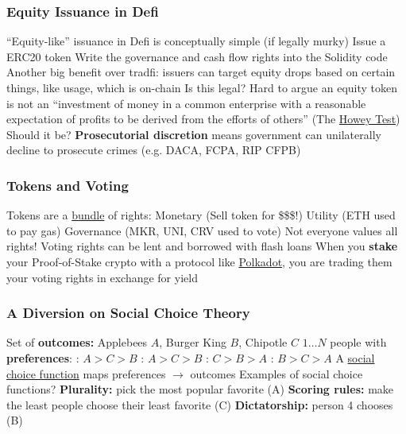 \documentclass[]{beamer}
\begin{document}
\begin{frame}
\frametitle{Equity Issuance in Defi}

\bi
\m ``Equity-like'' issuance in Defi is conceptually simple (if legally murky) 
\bi
\m Issue a ERC20 token
\m Write the governance and cash flow rights into the Solidity code 
\ei
\m Another big benefit over tradfi: issuers can target equity drops based on certain things, like usage, which is on-chain \pause 
\m Is this legal? \pause 
\bi 
\m Hard to argue an equity token is not an ``investment of money in a common enterprise with a reasonable expectation of profits to be derived from the efforts of others'' (The \href{https://www.sec.gov/about/divisions-offices/division-corporation-finance/framework-investment-contract-analysis-digital-assets}{Howey Test}) 
\ei 
\m Should it be? \pause 
\bi 
\m \textbf{Prosecutorial discretion} means government can unilaterally decline to prosecute crimes (e.g. DACA, FCPA, RIP CFPB) 
\ei 
\ei


\end{frame}


\begin{frame}
\frametitle{Tokens and Voting}

\bi
\m Tokens are a \ul{bundle} of rights:
\bi
\m Monetary (Sell token for \$\$\$!)
\m Utility (ETH used to pay gas)
\m Governance (MKR, UNI, CRV used to vote)
\ei
\m Not everyone values all rights! 
\m Voting rights can be lent and borrowed with flash loans 
\m When you \textbf{stake} your Proof-of-Stake crypto with a protocol like \href{https://polkadot.com/}{Polkadot}, you are trading them your voting rights in exchange for yield 
\ei

\end{frame}

\begin{frame}
\frametitle{A Diversion on Social Choice Theory}

\bi
\m Set of \textbf{outcomes:} Applebees $A$, Burger King $B$, Chipotle $C$ \pause
\m $1\ldots N$ people with \textbf{preferences}:
\bi
{}: $A>C>B$
: $A>C>B$
: $C>B>A$
: $B>C>A$
\ei \pause
\m A \ul{social choice function} maps preferences $\rightarrow$ outcomes \pause
\m Examples of social choice functions? \pause
\bi
\m \textbf{Plurality:} pick the most popular favorite (A) \pause
\m \textbf{Scoring rules:} make the least people choose their least favorite (C) \pause
\m \textbf{Dictatorship:} person 4 chooses (B)
\ei
\ei

\end{frame}
\end{document}
